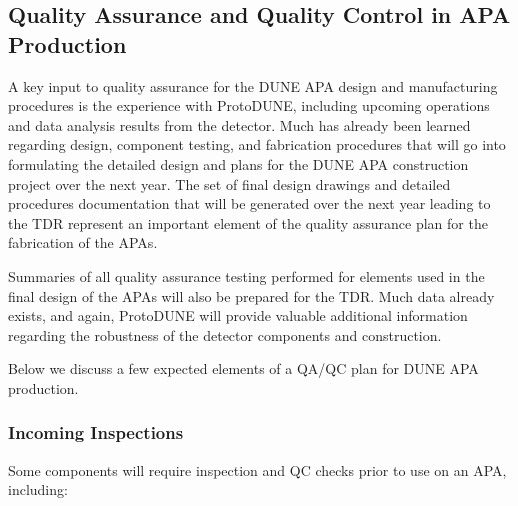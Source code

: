\subsection{Quality Assurance and Quality Control in APA Production}
\label{sec:fdsp-apa-qa}

A key input to quality assurance for the DUNE APA design and manufacturing procedures is the experience with ProtoDUNE, including upcoming operations and data analysis results from the detector.  Much has already been learned regarding design, component testing, and fabrication procedures that will go into formulating the detailed design and plans for the DUNE APA construction project over the next year.  The set of final design drawings and detailed procedures documentation that will be generated over the next year leading to the TDR represent an important element of the quality assurance plan for the fabrication of the APAs.  

Summaries of all quality assurance testing performed for elements used in the final design of the APAs will also be prepared for the TDR.  Much data already exists, and again, ProtoDUNE will provide valuable additional information regarding the robustness of the detector components and construction.  

Below we discuss a few expected elements of a QA/QC plan for DUNE APA production.   

\subsubsection{Incoming Inspections}

Some components will require inspection and QC checks prior to use on an APA, including:

